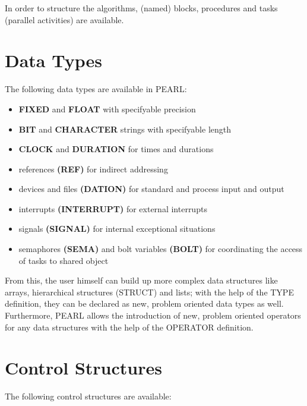 In order to structure the algorithms, (named) blocks, procedures and
tasks (parallel activities) are available.

\section{Data Types}   %

The following data types are available in PEARL:

\begin{itemize}
\item {\bf FIXED} and {\bf FLOAT} with specifyable precision
\item {\bf BIT} and {\bf CHARACTER} strings with specifyable length
\item {\bf CLOCK} and {\bf DURATION} for times and durations
\item references {\bf (REF)} for indirect addressing
\item devices and files {\bf (DATION)} for standard and process input and
      output
\item interrupts {\bf (INTERRUPT)} for external interrupts
\item signals {\bf (SIGNAL)} for internal exceptional situations
\item semaphores {\bf (SEMA)} and bolt variables {\bf (BOLT)} for
      coordinating the access of tasks to shared object
\end{itemize}

From this, the user himself can build up more complex data structures
like arrays, hierarchical structures (STRUCT) and lists; with the help
of the TYPE definition, they can be declared as new, problem oriented
data types as well. Furthermore, PEARL allows the introduction of new,
problem oriented operators for any data structures with the help of the
OPERATOR definition.

\section{Control Structures}   %

The following control structures are available:

